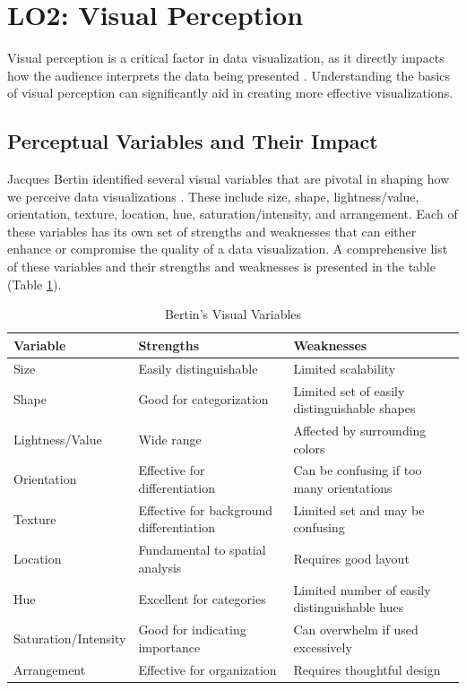 \section{LO2: Visual Perception}
Visual perception is a critical factor in data visualization, as it directly impacts how the audience interprets the data being presented \cite{wareInformationVisualizationPerception2013a}. Understanding the basics of visual perception can significantly aid in creating more effective visualizations.

\subsection{Perceptual Variables and Their Impact}
Jacques Bertin identified several visual variables that are pivotal in shaping how we perceive data visualizations \cite{bertinSemiologyGraphicsDiagrams2011}. These include size, shape, lightness/value, orientation, texture, location, hue, saturation/intensity, and arrangement. Each of these variables has its own set of strengths and weaknesses that can either enhance or compromise the quality of a data visualization. A comprehensive list of these variables and their strengths and weaknesses is presented in the table (Table \ref{tab:bertin_variables}).

\begin{table}[h]
    \centering
    \renewcommand{\arraystretch}{1.5} %
    \begin{tabularx}{\textwidth}{|X|X|X|}
    \hline
    \textbf{Variable} & \textbf{Strengths} & \textbf{Weaknesses} \\
    \hline \hline
    Size & Easily distinguishable & Limited scalability \\
    \hline
    Shape & Good for categorization & Limited set of easily distinguishable shapes \\
    \hline
    Lightness/Value & Wide range & Affected by surrounding colors \\
    \hline
    Orientation & Effective for differentiation & Can be confusing if too many orientations \\
    \hline
    Texture & Effective for background differentiation & Limited set and may be confusing \\
    \hline
    Location & Fundamental to spatial analysis & Requires good layout \\
    \hline
    Hue & Excellent for categories & Limited number of easily distinguishable hues \\
    \hline
    Saturation/Intensity & Good for indicating importance & Can overwhelm if used excessively \\
    \hline
    Arrangement & Effective for organization & Requires thoughtful design \\
    \hline
    \end{tabularx}
    \caption{Bertin's Visual Variables}
    \label{tab:bertin_variables}
\end{table}    

